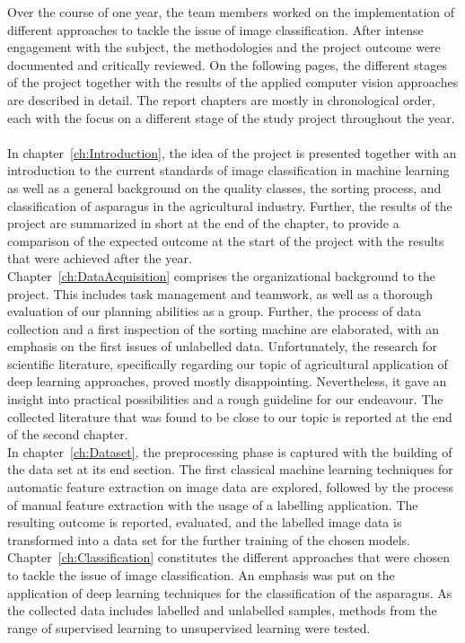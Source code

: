 Over the course of one year, the team members worked on the implementation of different approaches to tackle the issue of image classification. After intense engagement with the subject, the methodologies and the project outcome were documented and critically reviewed. On the following pages, the different stages of the project together with the results of the applied computer vision approaches are described in detail. The report chapters are mostly in chronological order, each with the focus on a different stage of the study project throughout the year. \\
\\
In chapter~\ref{ch:Introduction}, the idea of the project is presented together with an introduction to the current standards of image classification in machine learning as well as a general background on the quality classes, the sorting process, and classification of asparagus in the agricultural industry. Further, the results of the project are summarized in short at the end of the chapter, to provide a comparison of the expected outcome at the start of the project with the results that were achieved after the year. \\
Chapter~\ref{ch:DataAcquisition} comprises the organizational background to the project. This includes task management and teamwork, as well as a thorough evaluation of our planning abilities as a group. Further, the process of data collection and a first inspection of the sorting machine are elaborated, with an emphasis on the first issues of unlabelled data. Unfortunately, the research for scientific literature, specifically regarding our topic of agricultural application of deep learning approaches, proved mostly disappointing. Nevertheless, it gave an insight into practical possibilities and a rough guideline for our endeavour. The collected literature that was found to be close to our topic is reported at the end of the second chapter. \\
In chapter~\ref{ch:Dataset}, the preprocessing phase is captured with the building of the data set at its end section. The first classical machine learning techniques for automatic feature extraction on image data are explored, followed by the process of manual feature extraction with the usage of a labelling application. The resulting outcome is reported, evaluated, and the labelled image data is transformed into a data set for the further training of the chosen models. \\
Chapter~\ref{ch:Classification} constitutes the different approaches that were chosen to tackle the issue of image classification. An emphasis was put on the application of deep learning techniques for the classification of the asparagus. As the collected data includes labelled and unlabelled samples, methods from the range of supervised learning to unsupervised learning were tested. \\
